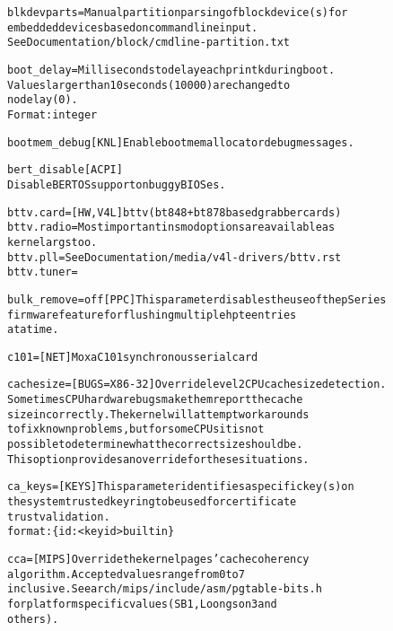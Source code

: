 \documentclass[a4paper,8pt,english]{sphinxmanual}
\begin{document}
\begin{alltt}
        blkdevparts=    Manual partition parsing of block device(s) for
                        embedded devices based on command line input.
                        See Documentation/block/cmdline-partition.txt

        boot\_delay=     Milliseconds to delay each printk during boot.
                        Values larger than 10 seconds (10000) are changed to
                        no delay (0).
                        Format: integer

        bootmem\_debug   {[}KNL{]} Enable bootmem allocator debug messages.

        bert\_disable    {[}ACPI{]}
                        Disable BERT OS support on buggy BIOSes.

        bttv.card=      {[}HW,V4L{]} bttv (bt848 + bt878 based grabber cards)
        bttv.radio=     Most important insmod options are available as
                        kernel args too.
        bttv.pll=       See Documentation/media/v4l-drivers/bttv.rst
        bttv.tuner=

        bulk\_remove=off {[}PPC{]}  This parameter disables the use of the pSeries
                        firmware feature for flushing multiple hpte entries
                        at a time.

        c101=           {[}NET{]} Moxa C101 synchronous serial card

        cachesize=      {[}BUGS=X86-32{]} Override level 2 CPU cache size detection.
                        Sometimes CPU hardware bugs make them report the cache
                        size incorrectly. The kernel will attempt work arounds
                        to fix known problems, but for some CPUs it is not
                        possible to determine what the correct size should be.
                        This option provides an override for these situations.

        ca\_keys=        {[}KEYS{]} This parameter identifies a specific key(s) on
                        the system trusted keyring to be used for certificate
                        trust validation.
                        format: \{ id:\textless{}keyid\textgreater{} \textbar{} builtin \}

        cca=            {[}MIPS{]} Override the kernel pages' cache coherency
                        algorithm.  Accepted values range from 0 to 7
                        inclusive. See arch/mips/include/asm/pgtable-bits.h
                        for platform specific values (SB1, Loongson3 and
                        others).


\end{alltt}
\end{document}
